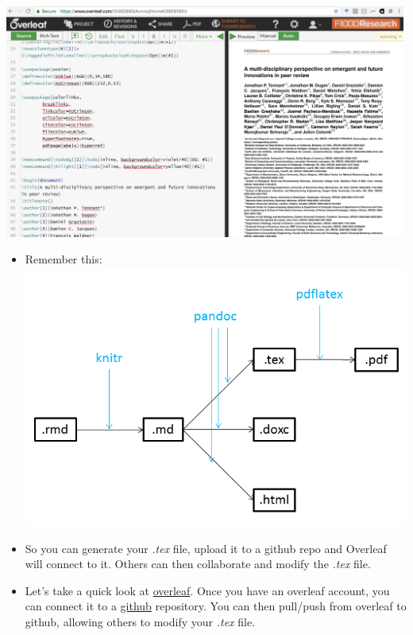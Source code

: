 \documentclass[]{article}
\begin{document}
\includegraphics[width=5.20833in,height=\textheight]{../figures/overleaf.png}

\begin{itemize}
\item
  Remember this:\\
  \includegraphics[width=5.20833in,height=\textheight]{../figures/pandoc1.png}
\item
  So you can generate your \emph{.tex} file, upload it to a github repo
  and Overleaf will connect to it. Others can then collaborate and
  modify the \emph{.tex} file.
\item
  Let's take a quick look at \href{https://www.overleaf.com/}{overleaf}.
  Once you have an overleaf account, you can connect it to a
  \href{https://www.github.com/}{github} repository. You can then
  pull/push from overleaf to github, allowing others to modify your
  \emph{.tex} file.
\end{itemize}
\end{document}
